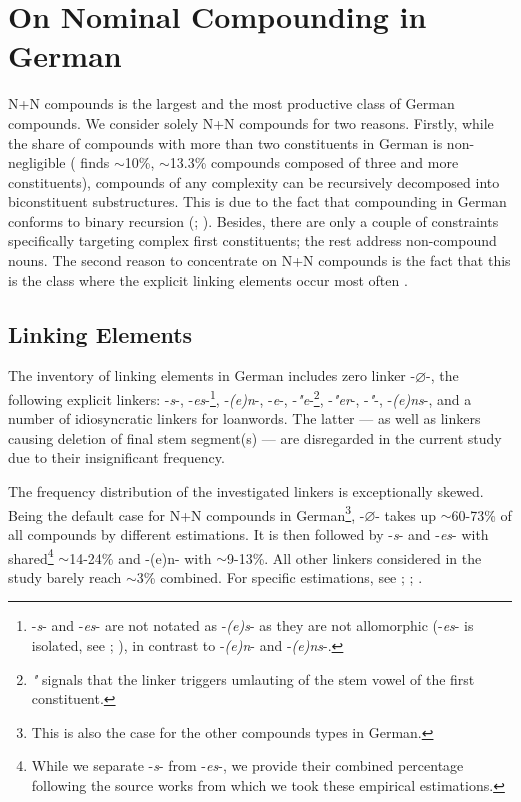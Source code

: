 \documentclass[10pt, a4paper]{article}
\newcommand{\zeroLinker}{\ensuremath{\boldsymbol{\varnothing}}}
\begin{document}

\section{On Nominal Compounding in German}
\label{sec:comps}

N+N compounds is the largest and the most productive class of German compounds. We consider solely N+N compounds for two reasons. Firstly, while the share of compounds with more than two constituents in German is non-negligible (\citealp[297]{augst_1975} finds $\sim$10\%, \citealp[13-30]{ortner_mueller-bollhagen_1991} $\sim$13.3\% compounds composed of three and more constituents), compounds of any complexity can be recursively decomposed into biconstituent substructures. This is due to the fact that compounding in German conforms to binary recursion (\citealp[219]{eisenberg_2013}; \citealp[226-227]{schaefer_2018}). Besides, there are only a couple of constraints specifically targeting complex first constituents; the rest address non-compound nouns. The second reason to concentrate on N+N compounds is the fact that this is the class where the explicit linking elements occur most often \citep{schluecker_2023}.


\subsection{Linking Elements}
\label{sec:linkers}

The inventory of linking elements in German includes zero linker -{\zeroLinker}-, the following explicit linkers: -\textit{s}-, -\textit{es}-\footnote{-\textit{s}- and -\textit{es}- are not notated as -\textit{(e)s}- as they are not allomorphic (-\textit{es}- is isolated, see \citealp[229]{eisenberg_2013}; \citealp{kuerschner_2010}), in contrast to -\textit{(e)n}- and -\textit{(e)ns}-.}, -\textit{(e)n}-, -\textit{e}-, -\textit{"e}-\footnote{\textit{"} signals that the linker triggers umlauting of the stem vowel of the first constituent.}, -\textit{"er}-, -\textit{"}-, -\textit{(e)ns}-, and a number of idiosyncratic linkers for loanwords. The latter --- as well as linkers causing deletion of final stem segment(s) --- are disregarded in the current study due to their insignificant frequency.

The frequency distribution of the investigated linkers is exceptionally skewed. Being the default case for N+N compounds in German\footnote{This is also the case for the other compounds types in German.}, -{\zeroLinker}- takes up $\sim$60-73\% of all compounds by different estimations. It is then followed by -\textit{s}- and -\textit{es}- with shared\footnote{While we separate -\textit{s}- from -\textit{es}-, we provide their combined percentage following the source works from which we took these empirical estimations.} $\sim$14-24\% and -(e)n- with $\sim$9-13\%. All other linkers considered in the study barely reach $\sim$3\% combined. For specific estimations, see \citealt{krott_etal_2007}; \citet[54]{ortner_mueller-bollhagen_1991}; \citet[229]{schaefer_2018}.
\end{document}
